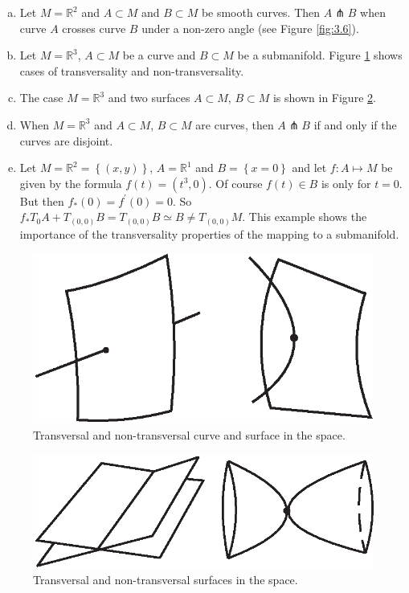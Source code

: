 \begin{example}
	\begin{enumerate}[(a)]
		\item Let $M=\mathbb{R}^{2}$ and $A\subset M$ and $B\subset M$ be smooth curves. Then  $A\pitchfork B$ when curve $A$ crosses curve $B$ under a non-zero angle (see Figure \ref{fig:3.6}).
		\item Let $M=\mathbb{R}^{3}$, $A\subset M$ be a curve and $B\subset M$ be a submanifold. Figure \ref{fig:3.7} shows cases of transversality and non-transversality.
		\item The case $M=\mathbb{R}^{3}$ and two surfaces $A\subset M$, $B\subset M$ is shown in Figure \ref{fig:3.8}.
		\item When $M=\mathbb{R}^{3}$ and $A\subset M$, $B\subset M$ are curves, then $A\pitchfork B$ if and only if the curves are disjoint.
		\item Let $M=\mathbb{R}^{2}=\left\{ \left( x,y\right) \right\}$, $A = \mathbb{R}^{1}$ and $B=\left\{ x=0\right\} $ and let $f:A\longmapsto M$  be given by the formula $f(t)=(t^{3},0)$. Of course $f(t)\in B$ is only for $t = 0$. But then $f_{\ast }(0)=f^{\prime }(0)=0$. So $f_{\ast		}T_{0}A+T_{(0,0)}B=T_{(0,0)}B\simeq B\not=T_{(0,0)}M$. This example shows the importance of the transversality properties of the mapping to a submanifold.
	\end{enumerate}
\end{example}

\begin{figure}[!ht]
	\centering
	\includegraphics [scale=1]{jtr37}
	\caption{Transversal and non-transversal curve and surface in the space.}
	\label{fig:3.7}
\end{figure}

\begin{figure}[!ht]
	\centering
	\includegraphics [scale=1]{jtr38}
	\caption{Transversal and non-transversal surfaces in the space.}
	\label{fig:3.8}
\end{figure}


